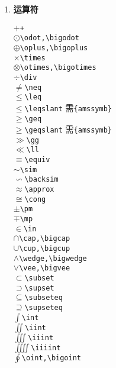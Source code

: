 \documentclass{article}
\newcommand{\q}{\quad}
\begin{document}
\begin{multicols}{2}
\begin{enumerate}
\item \textbf{运算符}
\vspace{-5mm}
\begin{multicols}{2} 
$ + $\q \verb|+| \\
$ \odot $\q \verb|\odot,\bigodot| \\
$ \oplus $\q \verb|\oplus,\bigoplus|\\
$ \times $\q \verb|\times| \\
$ \otimes $\q \verb|\otimes,\bigotimes| \\
$ \div $\q \verb|\div| \\
$ \neq $\q \verb|\neq| \\
$ \leq $\q \verb|\leq| \\
$ \leqslant $\q \verb|\leqslant| {\footnotesize 需\verb|{amssymb}|} \\
$ \geq $\q \verb|\geq| \\
$ \geqslant $\q \verb|\geqslant| {\footnotesize 需\verb|{amssymb}|} \\
$ \gg $\q \verb|\gg| \\
$ \ll $\q \verb|\ll| \\
$ \equiv $\q \verb|\equiv| \\
$ \sim $\q \verb|\sim| \\
$ \backsim $\q \verb|\backsim| \\
$ \approx $\q \verb|\approx| \\
$ \cong $\q \verb|\cong| \\
$ \pm $\q \verb|\pm| \\
$ \mp $\q \verb|\mp| \\
$ \in $\q \verb|\in| \\
$ \cap $\q \verb|\cap,\bigcap| \\
$ \cup $\q \verb|\cup,\bigcup| \\
$ \wedge $\q \verb|\wedge,\bigwedge| \\
$ \vee $\q \verb|\vee,\bigvee| \\
$ \subset $\q \verb|\subset| \\
$ \supset $\q \verb|\supset| \\
$ \subseteq $\q \verb|\subseteq| \\
$ \supseteq $\q \verb|\supseteq| \\
$ \int $\q \verb|\int| \\
$ \iint $\q \verb|\iint| \\
$ \iiint $\q \verb|\iiint| \\
$ \iiiint $\q \verb|\iiiint| \\
$ \oint $\q \verb|\oint,\bigoint|  

\end{multicols}
\end{enumerate}
\end{multicols}
\end{document}

